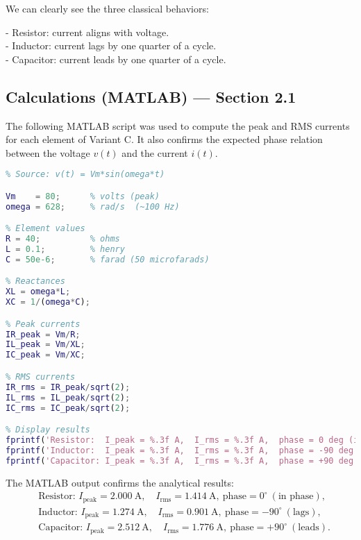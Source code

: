 \documentclass{article}
\begin{document}
\vspace{0.5cm}

We can clearly see the three classical behaviors:
\vspace{0.5cm}

- Resistor: current aligns with voltage.
\\ 
- Inductor: current lags by one quarter of a cycle.
\\ 
- Capacitor: current leads by one quarter of a cycle.



\subsection*{Calculations (MATLAB) --- Section 2.1}

The following MATLAB script was used to compute the peak and RMS currents
for each element of Variant C. It also confirms the expected phase relation
between the voltage $v(t)$ and the current $i(t)$.

\begin{lstlisting}[language=Matlab]
% Exercise 2.1 — Variant C
% Source: v(t) = Vm*sin(omega*t)

Vm    = 80;      % volts (peak)
omega = 628;     % rad/s  (~100 Hz)

% Element values
R = 40;          % ohms
L = 0.1;         % henry
C = 50e-6;       % farad (50 microfarads)

% Reactances
XL = omega*L;
XC = 1/(omega*C);

% Peak currents
IR_peak = Vm/R;
IL_peak = Vm/XL;
IC_peak = Vm/XC;

% RMS currents
IR_rms = IR_peak/sqrt(2);
IL_rms = IL_peak/sqrt(2);
IC_rms = IC_peak/sqrt(2);

% Display results
fprintf('Resistor:  I_peak = %.3f A,  I_rms = %.3f A,  phase = 0 deg (in phase)\n', IR_peak, IR_rms);
fprintf('Inductor:  I_peak = %.3f A,  I_rms = %.3f A,  phase = -90 deg (lags)\n', IL_peak, IL_rms);
fprintf('Capacitor: I_peak = %.3f A,  I_rms = %.3f A,  phase = +90 deg (leads)\n', IC_peak, IC_rms);
\end{lstlisting}

The MATLAB output confirms the analytical results:
\[
\begin{aligned}
&\text{Resistor: } I_{\text{peak}} = 2.000~\text{A},\quad I_{\text{rms}} = 1.414~\text{A},\ \text{phase} = 0^\circ \ (\text{in phase}),\\[6pt]
&\text{Inductor: } I_{\text{peak}} = 1.274~\text{A},\quad I_{\text{rms}} = 0.901~\text{A},\ \text{phase} = -90^\circ \ (\text{lags}),\\[6pt]
&\text{Capacitor: } I_{\text{peak}} = 2.512~\text{A},\quad I_{\text{rms}} = 1.776~\text{A},\ \text{phase} = +90^\circ \ (\text{leads}).
\end{aligned}
\]
\end{document}
